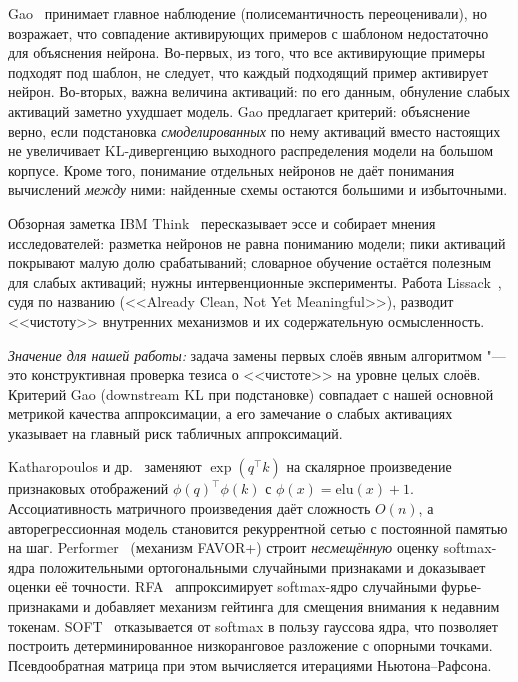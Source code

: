 Gao~\cite{gao_notclean} принимает главное наблюдение (полисемантичность
переоценивали), но возражает, что совпадение активирующих примеров с
шаблоном недостаточно для объяснения нейрона. Во-первых, из того, что
все активирующие примеры подходят под шаблон, не следует, что каждый
подходящий пример активирует нейрон. Во-вторых, важна величина
активаций: по его данным, обнуление слабых активаций заметно ухудшает
модель. Gao предлагает критерий: объяснение верно, если подстановка
\emph{смоделированных} по нему активаций вместо настоящих не
увеличивает KL-дивергенцию выходного распределения модели на большом
корпусе. Кроме того, понимание отдельных нейронов не даёт понимания
вычислений \emph{между} ними: найденные схемы остаются большими и
избыточными.

Обзорная заметка IBM Think~\cite{ibm_clean} пересказывает эссе и
собирает мнения исследователей: разметка нейронов не равна пониманию
модели; пики активаций покрывают малую долю срабатываний; словарное
обучение остаётся полезным для слабых активаций; нужны
интервенционные эксперименты. Работа Lissack~\cite{lissack_clean},
судя по названию (<<Already Clean, Not Yet Meaningful>>), разводит
<<чистоту>> внутренних механизмов и их содержательную осмысленность.

\emph{Значение для нашей работы:} задача замены первых слоёв явным
алгоритмом "--- это конструктивная проверка тезиса о <<чистоте>> на
уровне целых слоёв. Критерий Gao (downstream KL при подстановке)
совпадает с нашей основной метрикой качества аппроксимации, а его
замечание о слабых активациях указывает на главный риск табличных
аппроксимаций.

\label{sec:efficient}

Katharopoulos и др.~\cite{katharopoulos2020rnn} заменяют
$\exp(q^\top k)$ на скалярное произведение признаковых отображений
$\phi(q)^\top\phi(k)$ с $\phi(x)=\mathrm{elu}(x)+1$. Ассоциативность
матричного произведения даёт сложность $O(n)$, а авторегрессионная
модель становится рекуррентной сетью с постоянной памятью на шаг.
Performer~\cite{choromanski2021performer} (механизм FAVOR+)
строит \emph{несмещённую} оценку softmax-ядра положительными
ортогональными случайными признаками и доказывает оценки её
точности. RFA~\cite{peng2021rfa} аппроксимирует softmax-ядро
случайными фурье-признаками и добавляет механизм гейтинга для
смещения внимания к недавним токенам. SOFT~\cite{lu2021soft} отказывается
от softmax в пользу гауссова ядра, что позволяет построить
детерминированное низкоранговое разложение с опорными точками.
Псевдообратная матрица при этом вычисляется итерациями
Ньютона--Рафсона.

